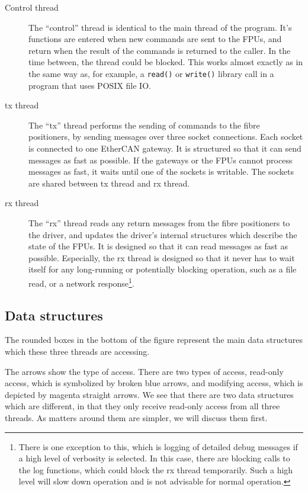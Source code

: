 \documentclass[fontsize=12,a4paper]{scrartcl}
\begin{document}
\begin{description}
\item[Control thread] The ``control''  thread is identical to the main thread of
  the program. It's functions are entered when new commands are sent
  to the FPUs, and return when the result of the commands is returned
  to the caller. In the time between, the thread could be
  blocked. This works almost exactly as in the same way
  as, for example, a \texttt{read()} or \texttt{write()} library
  call in a program that uses POSIX file IO.


\item[tx thread] The ``tx'' thread performs the sending of commands to
  the fibre positioners, by sending messages over three socket
  connections. Each socket is connected to one EtherCAN gateway. It is
  structured so that it can send messages as fast as possible. If the
  gateways or the FPUs cannot process messages as fast, it waits until
  one of the sockets is writable. The sockets are shared between tx
  thread and rx thread.

\item[rx thread] The ``rx'' thread reads any return messages from the
  fibre positioners to the driver, and updates the driver's internal
  structures which describe the state of the FPUs. It is designed so
  that it can read messages as fast as possible. Especially, the rx
  thread is designed so that it never has to wait itself for any
  long-running or potentially blocking operation, such as a file read,
  or a network response\footnote{There is one exception to this, which
    is logging of detailed debug messages if a high level of verbosity
    is selected. In this case, there are blocking calls to the log
    functions, which could block the rx thread temporarily. Such a
    high level will slow down operation and is not advisable for
    normal operation.}.

\end{description}


\subsection{Data structures}

The rounded boxes in the bottom of the figure represent the main data
structures which these three threads are accessing.

The arrows show the type of access. There are two types of access,
read-only access, which is symbolized by broken blue arrows, and
modifying access, which is depicted by magenta straight arrows. We see
that there are two data structures which are different, in that they
only receive read-only access from all three threads. As matters
around them are simpler, we will discuss them first.
\end{document}
